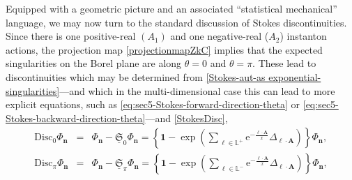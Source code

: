 \documentclass[11pt,a4paper]{article}
\def\BL{{\mathbb L}}
\def\1{\mathbf{1}}
\def\disc{{\mathrm{Disc}}}
\begin{document}
Equipped with a geometric picture and an associated ``statistical mechanical'' language, we may now turn to the standard discussion of Stokes discontinuities. Since there is one positive-real $(A_1)$ and one negative-real ($A_2$) instanton actions, the projection map \eqref{projectionmapZkC} implies that the expected singularities on the Borel plane are along $\theta=0$ and $\theta=\pi$. These lead to discontinuities which may be determined from \eqref{Stokes-aut-as exponential-singularities}---and which in the multi-dimensional case this can lead to more explicit equations, such as \eqref{eq:sec5-Stokes-forward-direction-theta} or \eqref{eq:sec5-Stokes-backward-direction-theta}---and \eqref{StokesDisc},
%
\begin{eqnarray}
\label{eq:nonlinear-disc-0}
\disc_0 \Phi_{\boldsymbol{n}} &=& \Phi_{\boldsymbol{n}} - \underline{\mathfrak{S}}_0 \Phi_{\boldsymbol n} = \left\{ \1 - \exp \left( \sum_{\,\boldsymbol{\ell} \in \BL^+} \mathrm{e}^{-\frac{\boldsymbol{\ell} \cdot \boldsymbol{A}}{x}} \Delta_{\boldsymbol{\ell} \cdot \boldsymbol{A}} \right) \right\} \Phi_{\boldsymbol{n}}, \\
\label{eq:nonlinear-disc-pi}
\disc_\pi \Phi_{\boldsymbol{n}} &=& \Phi_{\boldsymbol{n}} - \underline{\mathfrak{S}}_{\pi} \Phi_{\boldsymbol{n}} = \left\{ \1 - \exp \left( \sum_{\,\boldsymbol{\ell} \in \BL^-} \mathrm{e}^{-\frac{\boldsymbol{\ell} \cdot \boldsymbol{A}}{x}} \Delta_{\boldsymbol{\ell} \cdot \boldsymbol{A}} \right) \right\} \Phi_{\boldsymbol{n}},
\end{eqnarray}
%
\noindent
\end{document}
